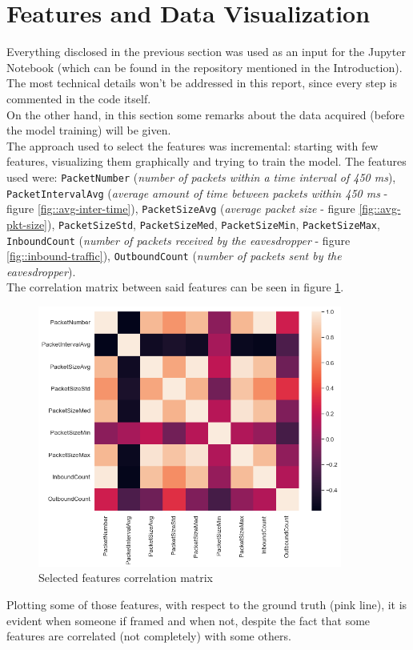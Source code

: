 \documentclass{article}
\begin{document}
\section{Features and Data Visualization}

Everything disclosed in the previous section was used as an input for the Jupyter Notebook (which can be found in the repository mentioned in the Introduction). The most technical details won't be addressed in this report, since every step is commented in the code itself. \\ On the other hand, in this section some remarks about the data acquired (before the model training) will be given. \\ The approach used to select the features was incremental: starting with few features, visualizing them graphically and trying to train the model. The features used were: \texttt{PacketNumber} (\textit{number of packets within a time interval of 450 ms}), \texttt{PacketIntervalAvg} (\textit{average amount of time between packets within 450 ms} - figure \ref{fig::avg-inter-time}), \texttt{PacketSizeAvg} (\textit{average packet size} - figure \ref{fig::avg-pkt-size}), \texttt{PacketSizeStd}, \texttt{PacketSizeMed}, \texttt{PacketSizeMin}, \texttt{PacketSizeMax}, \texttt{InboundCount} (\textit{number of packets received by the eavesdropper} - figure \ref{fig::inbound-traffic}), \texttt{OutboundCount} (\textit{number of packets sent by the eavesdropper}). \\ The correlation matrix between said features can be seen in figure \ref{fig::correlation-matrix}.

\begin{figure}[h!]
	\centering
	\includegraphics[width=10cm]{assets/correlation.png}
	\caption{Selected features correlation matrix}
	\label{fig::correlation-matrix}
\end{figure}
Plotting some of those features, with respect to the ground truth (pink line), it is evident when someone if framed and when not, despite the fact that some features are correlated (not completely) with some others.
\end{document}
